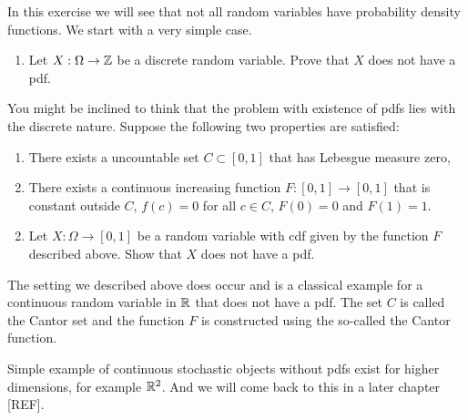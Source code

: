 \begin{problem}\label{prb:no_pdf}
In this exercise we will see that not all random variables have probability density functions. We start with a very simple case.
\begin{enumerate}[label=(\alph*)]
\item Let $X : \Omega \to \mathbb Z$ be a discrete random variable. Prove that $X$ does not have a pdf.
\end{enumerate}

You might be inclined to think that the problem with existence of pdfs lies with the discrete nature. Suppose the following two properties are satisfied:
\begin{enumerate}
\item There exists a uncountable set $C \subset [0,1]$ that has Lebesgue measure zero,
\item There exists a continuous increasing function $F: [0,1] \to [0,1]$ that is constant outside $C$, $f(c) = 0$ for all $c \in C$, $F(0) = 0$ and $F(1) = 1$.
\end{enumerate}

\begin{enumerate}[label=(\alph*)]
\setcounter{enumi}{1}
\item Let $X : \Omega \to [0,1]$ be a random variable with cdf given by the function $F$ described above. Show that $X$ does not have a pdf.
\end{enumerate}

The setting we described above does occur and is a classical example for a continuous random variable in $\mathbb R$ that does not have a pdf. The set $C$ is called the Cantor set and the function $F$ is constructed using the so-called the Cantor function. 

Simple example of continuous stochastic objects without pdfs exist for higher dimensions, for example $\mathbb R^2$. And we will come back to this in a later chapter [REF].
\end{problem}


